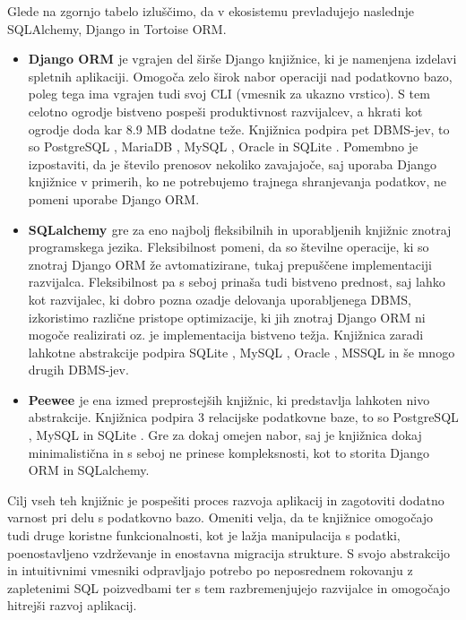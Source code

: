 \documentclass[a4paper,12pt,openright]{book}
\begin{document}
    \noindent
    Glede na zgornjo tabelo izluščimo, da v ekosistemu prevladujejo naslednje SQLAlchemy, Django in Tortoise ORM.
    \begin{itemize}
        \item \textbf{Django ORM \cite{DJANGO_GITHUB}} je vgrajen del širše Django knjižnice, ki je namenjena izdelavi spletnih aplikaciji. Omogoča zelo širok nabor operaciji nad podatkovno bazo, poleg tega ima vgrajen tudi svoj CLI (vmesnik za ukazno vrstico). S tem celotno ogrodje bistveno pospeši produktivnost razvijalcev, a hkrati kot ogrodje doda kar 8.9 MB dodatne teže. Knjižnica podpira pet DBMS-jev, to so PostgreSQL \cite{POSTGRESQL}, MariaDB \cite{MARIADB}, MySQL \cite{MYSQL}, Oracle \cite{ORACLE} in SQLite \cite{SQLITE}. Pomembno je izpostaviti, da je število prenosov nekoliko zavajajoče, saj uporaba Django knjižnice v primerih, ko ne potrebujemo trajnega shranjevanja podatkov, ne pomeni uporabe Django ORM.
        \item \textbf{SQLalchemy \cite{SQLALCHEMY_GITHUB}} gre za eno najbolj fleksibilnih in uporabljenih knjižnic znotraj programskega jezika. Fleksibilnost pomeni, da so številne operacije, ki so znotraj Django ORM že avtomatizirane, tukaj prepuščene implementaciji razvijalca. Fleksibilnost pa s seboj prinaša tudi bistveno prednost, saj lahko kot razvijalec, ki dobro pozna ozadje delovanja uporabljenega DBMS, izkoristimo različne pristope optimizacije, ki jih znotraj Django ORM ni mogoče realizirati oz. je implementacija bistveno težja. Knjižnica zaradi lahkotne abstrakcije podpira SQLite \cite{SQLITE}, MySQL \cite{MYSQL}, Oracle \cite{ORACLE}, MSSQL \cite{MSSQL} in še mnogo drugih DBMS-jev.
        \item \textbf{Peewee \cite{PEEWEE_GITHUB}} je ena izmed preprostejših knjižnic, ki predstavlja lahkoten nivo abstrakcije. Knjižnica podpira 3 relacijske podatkovne baze, to so PostgreSQL \cite{POSTGRESQL}, MySQL \cite{MYSQL} in SQLite \cite{SQLITE}. Gre za dokaj omejen nabor, saj je knjižnica dokaj minimalistična in s seboj ne prinese kompleksnosti, kot to storita Django ORM in SQLalchemy.
    \end{itemize}

    \noindent
    Cilj vseh teh knjižnic je pospešiti proces razvoja aplikacij in zagotoviti dodatno varnost pri delu s podatkovno bazo. Omeniti velja, da te knjižnice omogočajo tudi druge koristne funkcionalnosti, kot je lažja manipulacija s podatki, poenostavljeno vzdrževanje in enostavna migracija strukture. S svojo abstrakcijo in intuitivnimi vmesniki odpravljajo potrebo po neposrednem rokovanju z zapletenimi SQL poizvedbami ter s tem razbremenjujejo razvijalce in omogočajo hitrejši razvoj aplikacij.
\end{document}
